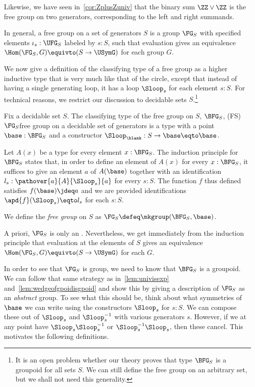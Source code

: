 Likewise, we have seen in~\cref{cor:ZplusZuniv} that the binary sum $\ZZ \vee \ZZ$
is the free group on two generators, corresponding to the left and right summands.

In general, a free group on a set of generators $S$ is a group $\FG_S$ with
specified elements $\iota_s:\UFG_S$ labeled by $s:S$,
such that evaluation gives an equivalence $\Hom(\FG_S,G) \equivto (S \to \USymG)$
for each group $G$.

We now give a definition of the classifying type of a free group
as a higher inductive type that is very much like that of the circle,
except that instead of having a single generating loop,
it has a loop $\Sloop_s$ for each element $s:S$.
For technical reasons, we restrict our discussion to decidable sets $S$.\footnote{%
  It is an open problem whether our theory proves that type $\BFG_S$
  is a groupoid for all sets $S$.
  We can still define the free group on an arbitrary set,
  but we shall not need this generality.}
\begin{definition}
  \label{def:bfree}
  Fix a decidable set $S$.
  The classifying type of the free group on $S$, $\BFG_S$,%
  \glossary(FS){$\protect\FG_S$}{free group on a decidable set of generators}
  is a type with a point $\base : \BFG_S$ and
  a constructor ${\Sloop_\blank} : S \to \base\eqto\base$.

  Let $A(x)$ be a type for every element $x:\BFG_S$.
  The induction principle for $\BFG_S$ states that,
  in order to define an element of $A(x)$ for every $x:\BFG_S$,
  it suffices to give an element $a$ of $A(\base)$ together
  with an identification $l_s:\pathover{a}{A}{\Sloop_s}{a}$
  for every $s:S$.
  The function $f$ thus defined satisfies $f(\base)\jdeq a$
  and we are provided identifications $\apd{f}(\Sloop_s)\eqto l_s$ for each $s:S$.

  We define the \emph{free group} on $S$ as $\FG_S \defeq \mkgroup(\BFG_S,\base)$.
\end{definition}

A priori, $\FG_S$ is only an \inftygp.
Nevertheless, we get immediately from the induction principle
that evaluation at the elements of $S$
gives an equivalence $\Hom(\FG_S,G) \equivto (S \to \USymG)$ for each
\inftygp $G$.

In order to see that $\FG_S$ is group,
we need to know that $\BFG_S$ is a groupoid.
We can follow that same strategy as in~\cref{lem:univisexp}
and~\cref{lem:wedgeofgpoidisgpoid}
and show this by giving a description of $\FG_S$ as an \emph{abstract} group.
To see what this should be, think about what symmetries of $\base$
we can write using the constructors $\Sloop_s$ for $s:S$.
We can compose these out of $\Sloop_s$ and $\Sloop_s^{-1}$
with various generators $s$.
However, if we at any point have $\Sloop_s\Sloop_s^{-1}$ or $\Sloop_s^{-1}\Sloop_s$,
then these cancel.
This motivates the following definitions.

